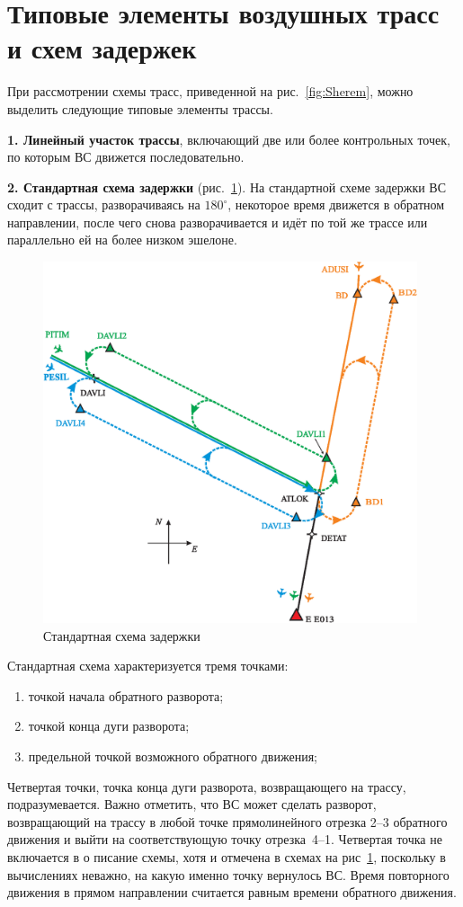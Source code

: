 \documentclass[12pt]{article}
\theoremstyle{plain}
\begin{document}
\section{Типовые элементы воздушных трасс и схем задержек}

При рассмотрении схемы трасс, приведенной на рис.~\ref{fig:Sherem}, можно выделить следующие типовые элементы трассы.

\textbf{1. Линейный участок трассы}, включающий две или более контрольных точек, по которым ВС движется последовательно.

\textbf{2. Стандартная схема задержки} (рис.~\ref{fig:StandardScheme}). На стандартной схеме задержки ВС сходит с трассы, разворачиваясь на $180^\circ$, некоторое время движется в обратном направлении, после чего снова разворачивается и идёт по той же трассе или параллельно ей на более низком эшелоне. 

\begin{figure}[h]
  \centering

  \includegraphics[width=11cm]{Scheme01_plane.eps}    %

  \caption{Стандартная схема задержки} 
  \label{fig:StandardScheme}
\end{figure}

Стандартная схема характеризуется тремя точками:
\begin{enumerate}[topsep=-0.5\parsep,itemsep=-0.5\parsep]
  \item точкой начала обратного разворота; 
  \item точкой конца дуги разворота;
  \item предельной точкой возможного обратного движения;
\end{enumerate}
Четвертая точки, точка конца дуги разворота, возвращающего на трассу, подразумевается.  Важно отметить, что ВС может сделать разворот, возвращающий на трассу в любой точке прямолинейного отрезка 2--3 обратного движения и выйти на соответствующую точку отрезка~4--1. Четвертая точка не включается в о писание схемы, хотя и отмечена в схемах на рис~\ref{fig:StandardScheme}, поскольку в вычислениях неважно, на какую именно точку вернулось ВС. Время повторного движения в прямом направлении считается равным времени обратного движения.
\end{document}
